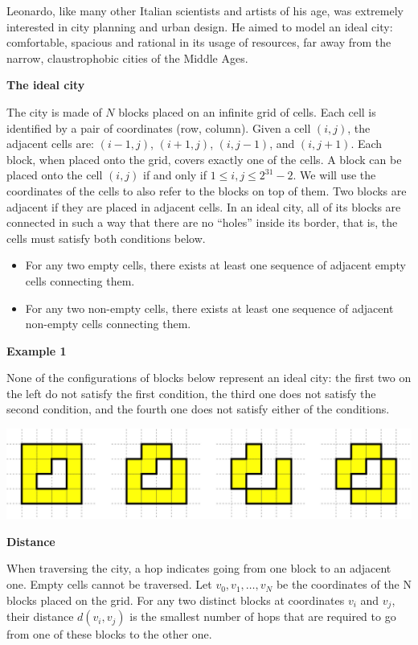 Leonardo, like many other Italian scientists and artists of his age, was extremely interested in city planning and urban design. He aimed to model an ideal city: comfortable, spacious and rational in its usage of resources, far away from the narrow, claustrophobic cities of the Middle Ages.

\bf{The ideal city}

The city is made of $N$ blocks placed on an infinite grid of cells. Each cell is identified by a pair of coordinates (row, column). Given a cell $(i, j)$, the adjacent cells are: $(i - 1, j)$, $(i + 1, j)$, $(i, j - 1)$, and $(i, j + 1)$. Each block, when placed onto the grid, covers exactly one of the cells. A block can be placed onto the cell $(i, j)$ if and only if $1 \le i, j \le 2^{31} - 2$. We will use the coordinates of the cells to also refer to the blocks on top of them. Two blocks are adjacent if they are placed in adjacent cells. In an ideal city, all of its blocks are connected in such a way that there are no ``holes'' inside its border, that is, the cells must satisfy both conditions below.

\begin{itemize}
\item For any two empty cells, there exists at least one sequence of adjacent empty cells connecting them.
\item For any two non-empty cells, there exists at least one sequence of adjacent non-empty cells connecting them.
\end{itemize}

\bf{Example 1}

None of the configurations of blocks below represent an ideal city: the first two on the left do not satisfy the first condition, the third one does not satisfy the second condition, and the fourth one does not satisfy either of the conditions. 

\includegraphics{2012-4-01.jpg}

\bf{Distance}

When traversing the city, a hop indicates going from one block to an adjacent one. Empty cells cannot be traversed. Let $v_0, v_1, \dots, v_N$ be the coordinates of the N blocks placed on the grid. For any two distinct blocks at coordinates $v_i$ and $v_j$, their distance $d(v_i, v_j)$ is the smallest number of hops that are required to go from one of these blocks to the other one.

